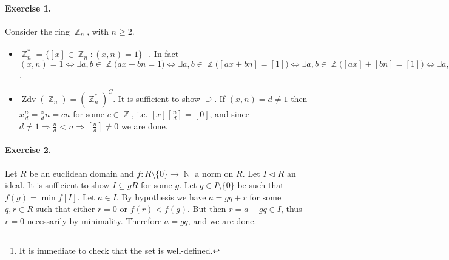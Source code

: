\documentclass[12pt,a4paper]{report}
\theoremstyle{definition}
\theoremstyle{num.custom-title}
\DeclareMathOperator{\zdv}{Zdv}
\DeclareMathOperator{\N}{\mathbb{N}}
\DeclareMathOperator{\Z}{\mathbb{Z}}
\DeclareMathOperator{\imp}{\Rightarrow}
\DeclareMathOperator{\sm}{\setminus}
\DeclareMathOperator{\sse}{\subseteq}
\begin{document}
\paragraph{Exercise 1.} Consider the ring $\Z_n$, with $n \geq 2$.
\begin{itemize}
\item $\Z_n^*=\{[x] \in \Z_n : (x,n)=1\}$ \footnote{It is immediate to check that the set is well-defined.}. In fact $(x,n)=1 \iff \exists a,b \in \Z \big( a x + b n = 1 \big) \iff \exists a,b \in \Z \big( [a x + b n] = [1] \big) \iff \exists a,b \in \Z \big( [a x] + [b n] = [1] \big) \iff \exists a,b \in \Z \big( [a][x] + [b][n] = [1] \big) \iff \exists [a] \in \Z_n \big( [a][x] = 1 \big)$.
\item $\zdv(\Z_n)=(\Z_n^*)^C$. It is sufficient to show $\supseteq$. If $(x,n)=d \neq 1$ then $x \frac{n}{d}= \frac{x}{d} n = cn$ for some $c \in \Z$, i.e. $[x][\frac{n}{d}]=[0]$, and since $d \neq 1 \imp \frac{n}{d} < n \imp [\frac{n}{d}] \neq 0$ we are done.
\end{itemize}

\paragraph{Exercise 2.} Let $R$ be an euclidean domain and $f: R \sm \{0\} \to \N$ a norm on $R$. Let $I \triangleleft R$ an ideal. It is sufficient to show $I \sse gR$ for some $g$. Let $g \in I \sm \{0\}$ be such that $f(g)=\min f[I]$. Let $a \in I$. By hypothesis we have $a=g q + r$ for some $q,r \in R$ such that either $r=0$ or $f(r)<f(g)$. But then $r=a - g q \in I$, thus $r=0$ necessarily by minimality. Therefore $a=g q$, and we are done.
\end{document}
